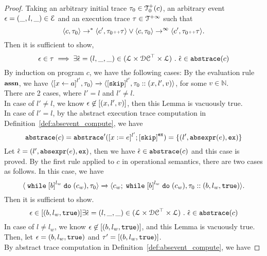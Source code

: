   \begin{proof}
    Taking an arbitrary initial trace $\mathtt{\tau}_0 \in \mathcal{T}^{+}_0(c)$, an arbitrary event $\mathtt{\epsilon} = (\_, l, \_) \in \mathcal{E}$ and an execution trace $\mathtt{\tau} \in \mathcal{T}^{+\infty}$
    such that
    \[
      \langle {c}, \mathtt{\tau}_0 \rangle \to^{*} \langle c', \mathtt{\tau}_0 {\scriptscriptstyle ++} \mathtt{\tau} \rangle 
      \lor 
      \langle {c}, \mathtt{\tau}_0 \rangle \to^{\infty} \langle c', \mathtt{\tau}_0 {\scriptscriptstyle ++} \mathtt{\tau} \rangle.
    \]
    Then it is sufficient to show,
    \[
      \mathtt{\epsilon} \in \mathtt{\tau}  \implies
      \exists \hat{\mathtt{\epsilon}{}} = (l, \_, \_) \in (\mathcal{L}\times \mathcal{DC}^{\top} \times \mathcal{L}) ~.~ 
      \hat{\mathtt{\epsilon}{}} \in \mathtt{abs}{\mathtt{trace}}(c)
    \]
    By induction on program $c$, we have the following cases:
    By the evaluation rule $\textbf{\small{assn}}$, we have
    $
    {
    \config{\clabel{\assign{{x}}{\aexpr}}^{l'},  \trace_0 } 
    \xrightarrow{} 
    \config{\clabel{\eskip}^{l'}, \trace_0 :: ({x}, l', v)}
    }$, for some $v \in \mathbb{N}$.
    \\
    There are 2 cases, where $l' = l$ and $l' \neq l$.
    \\
    In case of $l' \neq l$, we know $\mathtt{\epsilon} \not\in [({x}, l', v)]$, then this Lemma is vacuously true.
    \\
    In case of $l' = l$, by the abstract execution trace computation in Definition~\ref{def:absevent_compute}, we have 
    \[
      \absflow(c) = \absflow'([x := \expr]^{l'}; \clabel{\eskip}^{\lex}) = \{(l', \absexpr(\expr), \lex)\}
    \]
    Let $\hat{\mathtt{\epsilon}{}} = (l', \mathtt{abs}{\mathtt{expr}}(e), \mathtt{ex}) $, then we have $\hat{\mathtt{\epsilon}{}} \in \mathtt{abs}{\mathtt{trace}}(c)$ and this case is proved.
    By the first rule applied to $c$ in operational semantics, there are two cases as follows.
    In this case, we have
    \[
      \config{{\ewhile \clabel{b}^{l_w} \edo (c_w), \trace_0}}
      \xrightarrow{} 
      \config{{
      c_w; \ewhile \clabel{b}^{l_w} \edo (c_w),
      \trace_0 :: (b, l_w, \etrue)}}.
    \]
      Then it is sufficient to show.
      \[
        \mathtt{\epsilon} \in [(b, l_w, \mathtt{true})]
        \exists \hat{\mathtt{\epsilon}{}} = (l, \_, \_) \in (\mathcal{L}\times \mathcal{DC}^{\top} \times \mathcal{L}) ~.~ 
        \hat{\mathtt{\epsilon}{}} \in \mathtt{abs}{\mathtt{trace}}(c)
      \]
      In case of $l \neq l_w$, we know $\mathtt{\epsilon} \not \in [(b, l_w, \mathtt{true})]$, and this Lemma is vacuously true.
      \\
      Then, let $\mathtt{\epsilon} = (b, l_w, \mathtt{true})$ and $\mathtt{\tau}' =  [(b, l_w, \mathtt{true})]$. 
      \\
      By abstract trace computation in Definition~\ref{def:absevent_compute}, we have

\end{proof}
